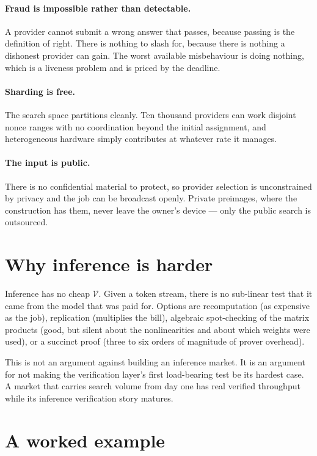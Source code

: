 \documentclass[11pt,a4paper]{article}
\begin{document}
\paragraph{Fraud is impossible rather than detectable.} A provider cannot submit
a wrong answer that passes, because passing is the definition of right. There is
nothing to slash for, because there is nothing a dishonest provider can gain.
The worst available misbehaviour is doing nothing, which is a liveness problem
and is priced by the deadline.

\paragraph{Sharding is free.} The search space partitions cleanly. Ten thousand
providers can work disjoint nonce ranges with no coordination beyond the initial
assignment, and heterogeneous hardware simply contributes at whatever rate it
manages.

\paragraph{The input is public.} There is no confidential material to protect,
so provider selection is unconstrained by privacy and the job can be broadcast
openly. Private preimages, where the construction has them, never leave the
owner's device --- only the public search is outsourced.

\section{Why inference is harder}

Inference has no cheap $\mathcal{V}$. Given a token stream, there is no
sub-linear test that it came from the model that was paid for. Options are
recomputation (as expensive as the job), replication (multiplies the bill),
algebraic spot-checking of the matrix products (good, but silent about the
nonlinearities and about which weights were used), or a succinct proof (three to
six orders of magnitude of prover overhead).

This is not an argument against building an inference market. It is an argument
for not making the verification layer's first load-bearing test be its hardest
case. A market that carries search volume from day one has real verified
throughput while its inference verification story matures.

\section{A worked example}
\end{document}
